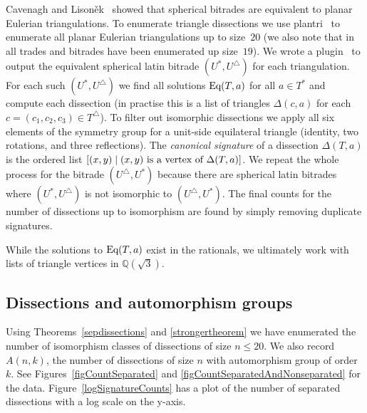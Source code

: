 \documentclass[12pt,amstags,fleqn]{article}
\theoremstyle{plain}
\theoremstyle{definition}
\def\ll{{\textstyle \ast}}
\def\rr{{\scriptscriptstyle \triangle}}
\newcommand{\opa}{\ll}
\newcommand{\opb}{\rr}
\newcommand{\eq}{\textnormal{Eq}}
\begin{document}
Cavenagh and Lison\v ek~\cite{planareulerian} showed that spherical
bitrades are equivalent to planar Eulerian triangulations. To enumerate
triangle dissections we
use plantri~\cite{plantri,plantri2} to enumerate all planar
Eulerian triangulations up to size~$20$ (we also note that
in~\cite{wanlessenumeration} all trades and bitrades have been
enumerated up size~$19$). We wrote a 
plugin~\cite{code} to output the equivalent spherical latin bitrade
$(U^{\opa}, U^{\opb})$ for each triangulation. For each such
$(U^{\opa},U^{\opb})$ we find all
solutions $\eq(T, a)$ for all $a \in T^{\opa}$ and compute each
dissection (in practise this is a list of triangles $\Delta(c,a)$ for
each $c = (c_1,c_2,c_3) \in T^{\rr}$).
To filter out isomorphic dissections we apply all six elements of
the symmetry group for a unit-side equilateral triangle (identity, two rotations,
and three reflections). The {\em canonical signature} of a dissection 
$\Delta(T,a)$ is
the ordered list $[(x,y) \mid (x,y) \textnormal{ is a
vertex of $\Delta(T,a)$}]$. We repeat the whole process for the bitrade $(U^{\opb},U^{\opa})$
because there are spherical latin bitrades where
$(U^{\opa},U^{\opb})$ is not isomorphic to $(U^{\opb},U^{\opa})$. The
final counts for the number of dissections up to isomorphism are found
by simply removing duplicate signatures.

While the solutions to $\eq(T, a)$ exist in the rationals, we ultimately work
with lists of triangle vertices in $\mathbb{Q}(\sqrt{3})$.

\subsection{Dissections and automorphism groups}

Using Theorems~\ref{sepdissections} and \ref{strongertheorem}
we have enumerated the number of isomorphism classes of
dissections of size $n \leq 20$. We also record $A(n,k)$, the
number of dissections of size $n$ with
automorphism group of order $k$. See Figures~\ref{figCountSeparated} and
\ref{figCountSeparatedAndNonseparated} for the data. Figure~\ref{logSignatureCounts} has a plot of the 
number of separated dissections with a log scale on the y-axis.
\end{document}
